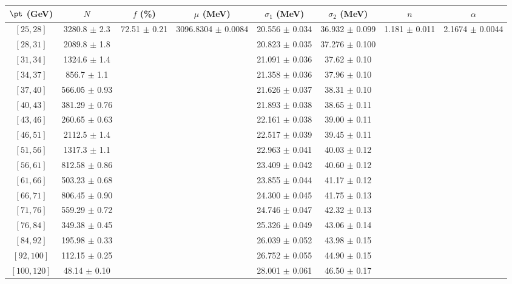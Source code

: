 \begin{tabular}{c||c|c|c|c|c|c|c}
$\pt$ (GeV) & $N$ & $f$ (\%) & $\mu$ (MeV) & $\sigma_1$ (MeV) & $\sigma_2$ (MeV) & $n$ & $\alpha$ \\
\hline
$[25, 28]$ & 3280.8 $\pm$ 2.3 & \multirow{17}{*}{72.51 $\pm$ 0.21} & \multirow{17}{*}{3096.8304 $\pm$ 0.0084} & 20.556 $\pm$ 0.034 & 36.932 $\pm$ 0.099 & \multirow{17}{*}{1.181 $\pm$ 0.011} & \multirow{17}{*}{2.1674 $\pm$ 0.0044}\\
$[28, 31]$ & 2089.8 $\pm$ 1.8 &  &  & 20.823 $\pm$ 0.035 & 37.276 $\pm$ 0.100 &  & \\
$[31, 34]$ & 1324.6 $\pm$ 1.4 &  &  & 21.091 $\pm$ 0.036 & 37.62 $\pm$ 0.10 &  & \\
$[34, 37]$ & 856.7 $\pm$ 1.1 &  &  & 21.358 $\pm$ 0.036 & 37.96 $\pm$ 0.10 &  & \\
$[37, 40]$ & 566.05 $\pm$ 0.93 &  &  & 21.626 $\pm$ 0.037 & 38.31 $\pm$ 0.10 &  & \\
$[40, 43]$ & 381.29 $\pm$ 0.76 &  &  & 21.893 $\pm$ 0.038 & 38.65 $\pm$ 0.11 &  & \\
$[43, 46]$ & 260.65 $\pm$ 0.63 &  &  & 22.161 $\pm$ 0.038 & 39.00 $\pm$ 0.11 &  & \\
$[46, 51]$ & 2112.5 $\pm$ 1.4 &  &  & 22.517 $\pm$ 0.039 & 39.45 $\pm$ 0.11 &  & \\
$[51, 56]$ & 1317.3 $\pm$ 1.1 &  &  & 22.963 $\pm$ 0.041 & 40.03 $\pm$ 0.12 &  & \\
$[56, 61]$ & 812.58 $\pm$ 0.86 &  &  & 23.409 $\pm$ 0.042 & 40.60 $\pm$ 0.12 &  & \\
$[61, 66]$ & 503.23 $\pm$ 0.68 &  &  & 23.855 $\pm$ 0.044 & 41.17 $\pm$ 0.12 &  & \\
$[66, 71]$ & 806.45 $\pm$ 0.90 &  &  & 24.300 $\pm$ 0.045 & 41.75 $\pm$ 0.13 &  & \\
$[71, 76]$ & 559.29 $\pm$ 0.72 &  &  & 24.746 $\pm$ 0.047 & 42.32 $\pm$ 0.13 &  & \\
$[76, 84]$ & 349.38 $\pm$ 0.45 &  &  & 25.326 $\pm$ 0.049 & 43.06 $\pm$ 0.14 &  & \\
$[84, 92]$ & 195.98 $\pm$ 0.33 &  &  & 26.039 $\pm$ 0.052 & 43.98 $\pm$ 0.15 &  & \\
$[92, 100]$ & 112.15 $\pm$ 0.25 &  &  & 26.752 $\pm$ 0.055 & 44.90 $\pm$ 0.15 &  & \\
$[100, 120]$ & 48.14 $\pm$ 0.10 &  &  & 28.001 $\pm$ 0.061 & 46.50 $\pm$ 0.17 &  & \\
\end{tabular}
